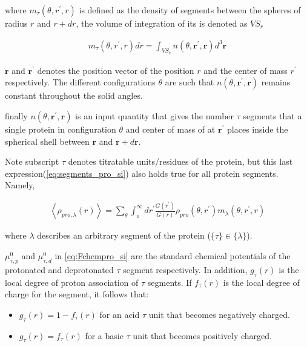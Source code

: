 \documentclass[journal=jacsat,manuscript=suppinfo]{achemso}
\begin{document}
\noindent where $m_\tau(\theta,r^\prime,r)$ is defined as the density of segments between the spheres of radius $r$ and $r + dr$, the volume of integration of its is denoted as $VS_r$

\begin{align}
	m_\tau(\theta, r^\prime, r)dr = \int_{VS_r} n(\theta,\textbf{r}^\prime, \textbf{r})d^3\textbf{r}
\end{align}

\noindent  $\textbf{r}$ and $\textbf{r}^\prime$ denotes the position vector of the position $r$ and the center of mass $r^\prime$ respectively. The different configurations $\theta$ are such that $n(\theta,\textbf{r}^\prime, \textbf{r})$ remains constant throughout the solid angles.

 finally $ n(\theta,\textbf{r}^\prime, \textbf{r})$ is an input quantity that gives the number $\tau$ segments that a single protein in configuration $\theta$ and center of mass of at $\textbf{r}^\prime$   places inside the spherical shell between $\textbf{r}$ and $\textbf{r}+d\textbf{r}$. 
 
Note subscript $\tau$ denotes titratable units/residues of the protein, but this last expression(\cref{eq:segments_pro_si}) also holds true for all protein segments.
Namely,

\begin{align}
	\left<\rho_{pro,\lambda}(r)\right> = \sum_\theta \int_o^\infty dr^\prime \frac{G(r^\prime)}{G(r)} \rho_{pro}(\theta,r^\prime)m_\lambda(\theta,r^\prime,r)
	\label{eq:allsegments_pro_si}
\end{align}



\noindent where $\lambda$ describes an arbitrary segment of the protein ($\{\tau\}\in\{\lambda\}$).



$\mu^0_{\tau,p}$ and $\mu^0_{\tau,d}$ in \cref{eq:Fchempro_si} are the standard chemical potentials of the protonated and deprotonated $\tau$ segment respectively.
In addition, $g_\tau(r)$ is the local degree of proton association of $\tau$ segments.
If $f_\tau(r)$ is the local degree of charge for the segment, it follows that: 
\begin{itemize}
	\item $g_\tau(r) = 1-f_\tau(r)$ for an acid $\tau$ unit that becomes negatively charged.
	\item  $g_\tau(r) = f_\tau(r)$ for a basic $\tau$ unit that becomes positively charged.
\end{itemize}
\end{document}
